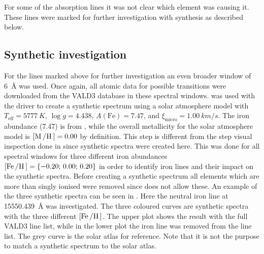 For some of the absorption lines it was not clear which element was causing it. These lines were
marked for further investigation with synthesis as described below.

\subsection{Synthetic investigation}

For the lines marked above for further investigation an even broader window of \SI{6}{\angstrom} was
used. Once again, all atomic data for possible transitions were downloaded from the VALD3 database
in these spectral windows.  was used with the  driver to create a synthetic
spectrum using a solar atmosphere model with $T_\mathrm{eff}=\SI{5777}{K}$, $\log g=4.438$,
$A(\mathrm{Fe})=7.47$, and $\xi_\mathrm{micro}=\SI{1.00}{km/s}$. The iron abundance (7.47) is from
\citet{Gonzalez2000}, while the overall metallicity for the solar atmosphere model is
$[\ion{M}/\ion{H}]=0.00$ by definition. This step is different from the step visual inspection done
in  since synthetic spectra were created here. This was done for all spectral
windows for three different iron abundances $[\ion{Fe}/\ion{H}]=\{-0.20;\,0.00;\,0.20\}$ in order to
identify iron lines and their impact on the synthetic spectra.  Before creating a synthetic spectrum all elements which are
more than singly ionised were removed since  does not allow these. An example of the
three synthetic spectra can be seen in . Here the neutral iron
line at \SI{15550.439}{\angstrom} was investigated. The three coloured curves are synthetic spectra
with the three different $[\ion{Fe}/\ion{H}]$. The upper plot shows the result with the full VALD3
line list, while in the lower plot the iron line was removed from the line list. The grey curve is
the solar atlas for reference. Note that it is not the purpose to match a synthetic spectrum to the
solar atlas.

